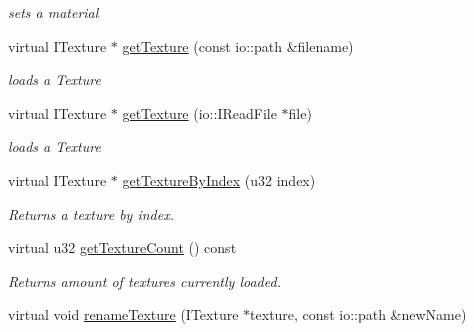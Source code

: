 \begin{DoxyCompactItemize}
\begin{DoxyCompactList}\small\item\em sets a material \end{DoxyCompactList}\item 
\hypertarget{classirr_1_1video_1_1_c_null_driver_aa966b4d91b9d7d3c2b5e2f3b118688ed}{virtual I\-Texture $\ast$ \hyperlink{classirr_1_1video_1_1_c_null_driver_aa966b4d91b9d7d3c2b5e2f3b118688ed}{get\-Texture} (const io\-::path \&filename)}\label{classirr_1_1video_1_1_c_null_driver_aa966b4d91b9d7d3c2b5e2f3b118688ed}

\begin{DoxyCompactList}\small\item\em loads a Texture \end{DoxyCompactList}\item 
\hypertarget{classirr_1_1video_1_1_c_null_driver_aff22b1bc51d8b39c0367b96ec1c9befb}{virtual I\-Texture $\ast$ \hyperlink{classirr_1_1video_1_1_c_null_driver_aff22b1bc51d8b39c0367b96ec1c9befb}{get\-Texture} (io\-::\-I\-Read\-File $\ast$file)}\label{classirr_1_1video_1_1_c_null_driver_aff22b1bc51d8b39c0367b96ec1c9befb}

\begin{DoxyCompactList}\small\item\em loads a Texture \end{DoxyCompactList}\item 
\hypertarget{classirr_1_1video_1_1_c_null_driver_ab1ffc20afddde50e83dfd4dda0136505}{virtual I\-Texture $\ast$ \hyperlink{classirr_1_1video_1_1_c_null_driver_ab1ffc20afddde50e83dfd4dda0136505}{get\-Texture\-By\-Index} (u32 index)}\label{classirr_1_1video_1_1_c_null_driver_ab1ffc20afddde50e83dfd4dda0136505}

\begin{DoxyCompactList}\small\item\em Returns a texture by index. \end{DoxyCompactList}\item 
\hypertarget{classirr_1_1video_1_1_c_null_driver_a736147380f7cda379494cb5d71ccacaa}{virtual u32 \hyperlink{classirr_1_1video_1_1_c_null_driver_a736147380f7cda379494cb5d71ccacaa}{get\-Texture\-Count} () const }\label{classirr_1_1video_1_1_c_null_driver_a736147380f7cda379494cb5d71ccacaa}

\begin{DoxyCompactList}\small\item\em Returns amount of textures currently loaded. \end{DoxyCompactList}\item 
\hypertarget{classirr_1_1video_1_1_c_null_driver_ae5ae083703e3fa8fe0512fcf9522f9b9}{virtual void \hyperlink{classirr_1_1video_1_1_c_null_driver_ae5ae083703e3fa8fe0512fcf9522f9b9}{rename\-Texture} (I\-Texture $\ast$texture, const io\-::path \&new\-Name)}\label{classirr_1_1video_1_1_c_null_driver_ae5ae083703e3fa8fe0512fcf9522f9b9}


\end{DoxyCompactItemize}
